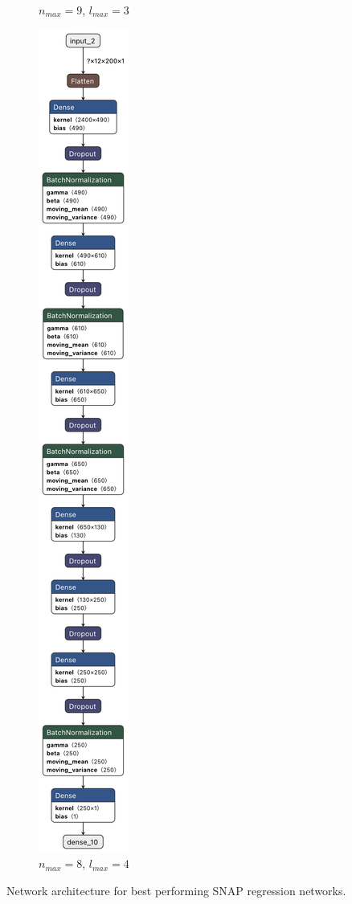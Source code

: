 \begin{figure}
\begin{subfigure}[t]{.155\textwidth}
    \caption{$n_{max}=9$, $l_{max}=3$}
  \end{subfigure}
  \hfill
  \begin{subfigure}[t]{.155\textwidth}
    \centering
    \includegraphics[width=\linewidth]{figures/regression/model_8-4.png}
    \caption{$n_{max}=8$, $l_{max}=4$}
  \end{subfigure}

  \caption[Network architectures]{Network architecture for best performing SNAP regression networks.
  }
  \label{fig:architectures}
\end{figure}

